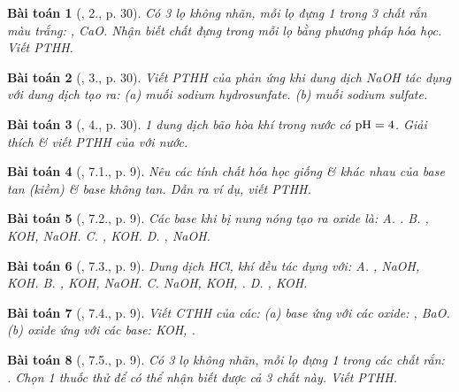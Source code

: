 \documentclass{article}
\newtheorem{baitoan}{Bài toán}
\begin{document}
\begin{baitoan}[\cite{SGK_Hoa_Hoc_9}, 2., p. 30]
	Có 3 lọ không nhãn, mỗi lọ đựng 1 trong 3 chất rắn màu trắng: {\rm{}, CaO}. Nhận biết chất đựng trong mỗi lọ bằng phương pháp hóa học. Viết {\rm PTHH}.
\end{baitoan}

\begin{baitoan}[\cite{SGK_Hoa_Hoc_9}, 3., p. 30]
	Viết {\rm PTHH} của phản ứng khi dung dịch {\rm NaOH} tác dụng với dung dịch {\rm{}} tạo ra: (a) muối sodium hydrosunfate. (b) muối sodium sulfate.
\end{baitoan}

\begin{baitoan}[\cite{SGK_Hoa_Hoc_9}, 4., p. 30]
	1 dung dịch bão hòa khí {\rm{}} trong nước có $\rm pH = 4$. Giải thích \& viết {\rm PTHH} của {\rm{}} với nước.
\end{baitoan}

\begin{baitoan}[\cite{SGK_Hoa_Hoc_9}, 7.1., p. 9]
	Nêu các tính chất hóa học giống \& khác nhau của base tan (kiềm) \& base không tan. Dẫn ra ví dụ, viết PTHH.
\end{baitoan}

\begin{baitoan}[\cite{SGK_Hoa_Hoc_9}, 7.2., p. 9]
	Các base khi bị nung nóng tạo ra oxide là: {\sf A.} {\rm{}}. {\sf B.} {\rm{}, KOH, NaOH}. {\sf C.} {\rm{}, KOH}. {\sf D.} {\rm{}, NaOH}.
\end{baitoan}

\begin{baitoan}[\cite{SGK_Hoa_Hoc_9}, 7.3., p. 9]
	Dung dịch {\rm HCl}, khí {\rm{}} đều tác dụng với: {\sf A.} {\rm{}, NaOH, KOH}. {\sf B.} {\rm{}, KOH, NaOH}. {\sf C.} {\rm NaOH, KOH, }. {\sf D.} {\rm{}, KOH}.
\end{baitoan}

\begin{baitoan}[\cite{SGK_Hoa_Hoc_9}, 7.4., p. 9]
	Viết CTHH của các: (a) base ứng với các oxide: {\rm{}, BaO}. (b) oxide ứng với các base: {\rm KOH, }.
\end{baitoan}

\begin{baitoan}[\cite{SGK_Hoa_Hoc_9}, 7.5., p. 9]
	Có 3 lọ không nhãn, mỗi lọ đựng 1 trong các chất rắn: {\rm{}}. Chọn 1 thuốc thử để có thể nhận biết được cả 3 chất này. Viết {\rm PTHH}.
\end{baitoan}
\end{document}
